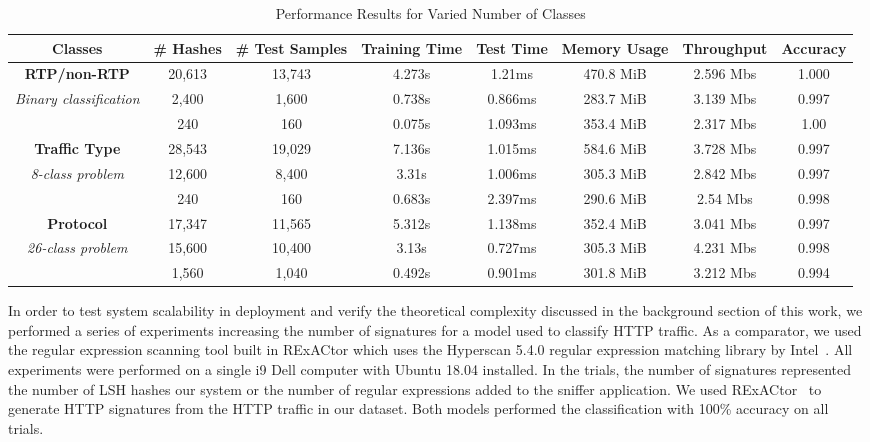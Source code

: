 \begin{table} [ht!]
\caption{Performance Results for Varied Number of Classes}
\centering
\begin{tabular}{| c | c | c | c | c | c | c | c |}
\hline
Classes & \# Hashes & \# Test Samples & Training Time & Test Time & Memory Usage & Throughput & Accuracy \\
\hline
\hline
\textbf{RTP/non-RTP} & 20,613 & 13,743 & 4.273s & 1.21ms & 470.8 MiB & 2.596 Mb\/s & 1.000 \\
\textit{Binary classification} & 2,400 & 1,600 & 0.738s & 0.866ms & 283.7 MiB & 3.139 Mb\/s & 0.997 \\
& 240 & 160 & 0.075s & 1.093ms & 353.4 MiB & 2.317 Mb\/s & 1.00 \\
\hline
\textbf{Traffic Type} & 28,543 & 19,029 & 7.136s & 1.015ms & 584.6 MiB & 3.728 Mb\/s & 0.997 \\
\textit{8-class problem} & 12,600 & 8,400 & 3.31s & 1.006ms & 305.3 MiB & 2.842 Mb\/s & 0.997 \\
& 240 & 160 & 0.683s & 2.397ms & 290.6 MiB & 2.54 Mb\/s & 0.998 \\
\hline
\textbf{Protocol} & 17,347 & 11,565 & 5.312s & 1.138ms & 352.4 MiB & 3.041 Mb\/s & 0.997 \\
\textit{26-class problem} & 15,600 & 10,400 & 3.13s & 0.727ms & 305.3 MiB & 4.231 Mb\/s & 0.998 \\
& 1,560 & 1,040 & 0.492s & 0.901ms & 301.8 MiB & 3.212 Mb\/s & 0.994 \\
\hline
\end{tabular}
\label{table:performanceresults}
\end{table}

In order to test system scalability in deployment and verify the theoretical complexity discussed in the background section of this work, we performed a series of experiments increasing the number of signatures for a model used to classify HTTP traffic. As a comparator, we used the regular expression scanning tool built in RExACtor which uses the Hyperscan 5.4.0 regular expression matching library by Intel~\cite{hyperscan}. All experiments were performed on a single i9 Dell computer with Ubuntu 18.04 installed. In the trials, the number of signatures represented the number of LSH hashes our system or the number of regular expressions added to the sniffer application. We used RExACtor~\cite{rexactor} to generate HTTP signatures from the HTTP traffic in our dataset. Both models performed the classification with 100\% accuracy on all trials.

